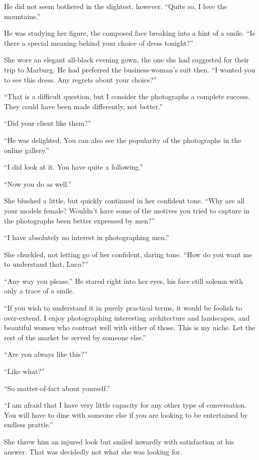 He did not seem bothered in the slightest, however. ``Quite so, I love the mountains.''

He was studying her figure, the composed face breaking into a hint of a smile. ``Is there a special meaning behind your choice of dress tonight?''

She wore an elegant all-black evening gown, the one she had suggested for their trip to Marburg. He had preferred the business-woman's suit then. ``I wanted you to see this dress. Any regrets about your choice?''

``That is a difficult question, but I consider the photographs a complete success. They could have been made differently, not better.''

``Did your client like them?''

``He was delighted. You can also see the popularity of the photographs in the online gallery.''

``I did look at it. You have quite a following.''

``Now you do as well.''

She blushed a little, but quickly continued in her confident tone. ``Why are all your models female? Wouldn't have some of the motives you tried to capture in the photographs been better expressed by men?''

``I have absolutely no interest in photographing men.''

She chuckled, not letting go of her confident, daring tone. ``How do you want me to understand that, Luca?''

``Any way you please.'' He stared right into her eyes, his face still solemn with only a trace of a smile.

``If you wish to understand it in purely practical terms, it would be foolish to over-extend. I enjoy photographing interesting architecture and landscapes, and beautiful women who contrast well with either of those. This is my niche. Let the rest of the market be served by someone else.''

``Are you always like this?''

``Like what?''

``So matter-of-fact about yourself.''

``I am afraid that I have very little capacity for any other type of conversation. You will have to dine with someone else if you are looking to be entertained by endless prattle.''

She threw him an injured look but smiled inwardly with satisfaction at his answer. That was decidedly not what she was looking for.


